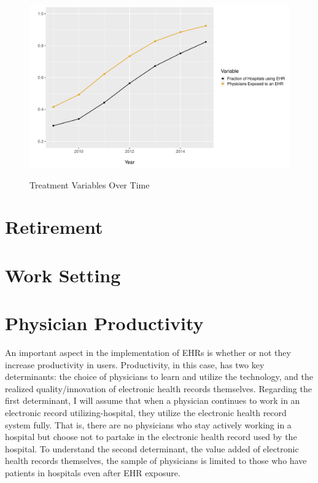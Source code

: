 \documentclass[11pt]{article}
\begin{document}
\begin{figure}
    \caption{Treatment Variables Over Time}
    \vspace{-2mm}
    \includegraphics[scale=.5]{Objects/sum_stats_year.pdf}
    \label{fig:figure1}
\end{figure}



\section{Retirement}

\section{Work Setting}

\section{Physician Productivity}

An important aspect in the implementation of EHRs is whether or not they increase productivity in users. Productivity, in this case, has two key determinants: the choice of physicians to learn and utilize the technology, and the realized quality/innovation of electronic health records themselves. Regarding the first determinant, I will assume that when a physician continues to work in an electronic record utilizing-hospital, they utilize the electronic health record system fully. That is, there are no physicians who stay actively working in a hospital but choose not to partake in the electronic health record used by the hospital. To understand the second determinant, the value added of electronic health records themselves, the sample of physicians is limited to those who have patients in hospitals even after EHR exposure. 
\end{document}

